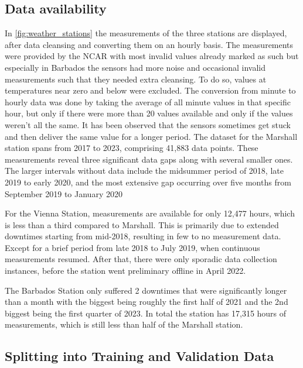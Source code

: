 \subsection{Data availability}
In \autoref{fig:weather_stations} the measurements of the three stations are displayed, after data cleansing and converting them on an hourly basis. The measurements were provided by the NCAR with most invalid values already marked as such but especially in Barbados the sensors had more noise and occasional invalid measurements such that they needed extra cleansing. To do so, values at temperatures near zero and below were excluded. The conversion from minute to hourly data was done by taking the average of all minute values in that specific hour, but only if there were more than 20 values available and only if the values weren't all the same. It has been observed that the sensors sometimes get stuck and then deliver the same value for a longer period. The dataset for the Marshall station spans from 2017 to 2023, comprising 41,883 data points. These measurements reveal three significant data gaps along with several smaller ones. The larger intervals without data include the midsummer period of 2018, late 2019 to early 2020, and the most extensive gap occurring over five months from September 2019 to January 2020

For the Vienna Station, measurements are available for only 12,477 hours, which is less than a third compared to Marshall. This is primarily due to extended downtimes starting from mid-2018, resulting in few to no measurement data. Except for a brief period from late 2018 to July 2019, when continuous measurements resumed. After that, there were only sporadic data collection instances, before the station went preliminary offline in April 2022.

The Barbados Station only suffered 2 downtimes that were significantly longer than a month with the biggest being roughly the first half of 2021 and the 2nd biggest being the first quarter of 2023. In total the station has 17,315 hours of measurements, which is still less than half of the Marshall station. 

\subsection*{Splitting into Training and Validation Data}

